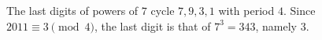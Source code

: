 The last digits of powers of $7$ cycle $7,9,3,1$ with period $4$. Since $2011\equiv3\pmod4$, the last digit is that of $7^3=343$, namely $\boxed{3}$.
